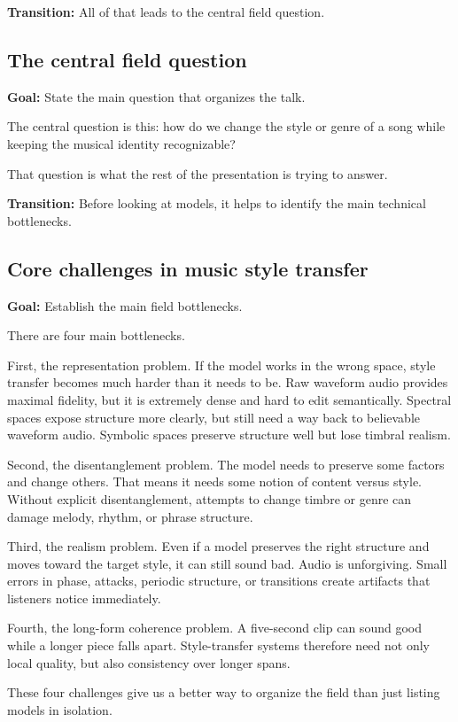 \documentclass[11pt]{article}
\begin{document}
\textbf{Transition:} All of that leads to the central field question.

\subsection*{The central field question}
\textbf{Goal:} State the main question that organizes the talk.

The central question is this: how do we change the style or genre of a song while keeping the musical identity recognizable?

That question is what the rest of the presentation is trying to answer.

\textbf{Transition:} Before looking at models, it helps to identify the main technical bottlenecks.

\subsection*{Core challenges in music style transfer}
\textbf{Goal:} Establish the main field bottlenecks.

There are four main bottlenecks.

First, the representation problem. If the model works in the wrong space, style transfer becomes much harder than it needs to be. Raw waveform audio provides maximal fidelity, but it is extremely dense and hard to edit semantically. Spectral spaces expose structure more clearly, but still need a way back to believable waveform audio. Symbolic spaces preserve structure well but lose timbral realism.

Second, the disentanglement problem. The model needs to preserve some factors and change others. That means it needs some notion of content versus style. Without explicit disentanglement, attempts to change timbre or genre can damage melody, rhythm, or phrase structure.

Third, the realism problem. Even if a model preserves the right structure and moves toward the target style, it can still sound bad. Audio is unforgiving. Small errors in phase, attacks, periodic structure, or transitions create artifacts that listeners notice immediately.

Fourth, the long-form coherence problem. A five-second clip can sound good while a longer piece falls apart. Style-transfer systems therefore need not only local quality, but also consistency over longer spans.

These four challenges give us a better way to organize the field than just listing models in isolation.
\end{document}

